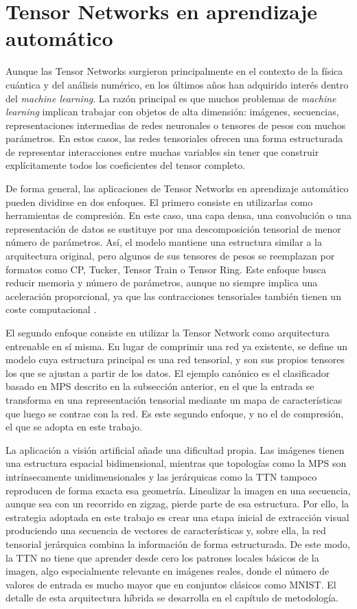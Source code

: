 \section{Tensor Networks en aprendizaje automático}

Aunque las Tensor Networks surgieron principalmente en el contexto de la física cuántica y del análisis numérico, en los últimos años han adquirido interés dentro del \textit{machine learning}. La razón principal es que muchos problemas de \textit{machine learning} implican trabajar con objetos de alta dimensión: imágenes, secuencias, representaciones intermedias de redes neuronales o tensores de pesos con muchos parámetros. En estos casos, las redes tensoriales ofrecen una forma estructurada de representar interacciones entre muchas variables sin tener que construir explícitamente todos los coeficientes del tensor completo.

De forma general, las aplicaciones de Tensor Networks en aprendizaje automático pueden dividirse en dos enfoques. El primero consiste en utilizarlas como herramientas de compresión. En este caso, una capa densa, una convolución o una representación de datos se sustituye por una descomposición tensorial de menor número de parámetros. Así, el modelo mantiene una estructura similar a la arquitectura original, pero algunos de sus tensores de pesos se reemplazan por formatos como CP, Tucker, Tensor Train o Tensor Ring. Este enfoque busca reducir memoria y número de parámetros, aunque no siempre implica una aceleración proporcional, ya que las contracciones tensoriales también tienen un coste computacional .

El segundo enfoque consiste en utilizar la Tensor Network como arquitectura entrenable en sí misma. En lugar de comprimir una red ya existente, se define un modelo cuya estructura principal es una red tensorial, y son sus propios tensores los que se ajustan a partir de los datos. El ejemplo canónico es el clasificador basado en MPS descrito en la subsección anterior, en el que la entrada se transforma en una representación tensorial mediante un mapa de características que luego se contrae con la red. Es este segundo enfoque, y no el de compresión, el que se adopta en este trabajo.

La aplicación a visión artificial añade una dificultad propia. Las imágenes tienen una estructura espacial bidimensional, mientras que topologías como la MPS son intrínsecamente unidimensionales y las jerárquicas como la TTN tampoco reproducen de forma exacta esa geometría. Linealizar la imagen en una secuencia, aunque sea con un recorrido en zigzag, pierde parte de esa estructura. Por ello, la estrategia adoptada en este trabajo es crear una etapa inicial de extracción visual produciendo una secuencia de vectores de características y, sobre ella, la red tensorial jerárquica combina la información de forma estructurada. De este modo, la TTN no tiene que aprender desde cero los patrones locales básicos de la imagen, algo especialmente relevante en imágenes reales, donde el número de valores de entrada es mucho mayor que en conjuntos clásicos como MNIST. El detalle de esta arquitectura híbrida se desarrolla en el capítulo de metodología.

